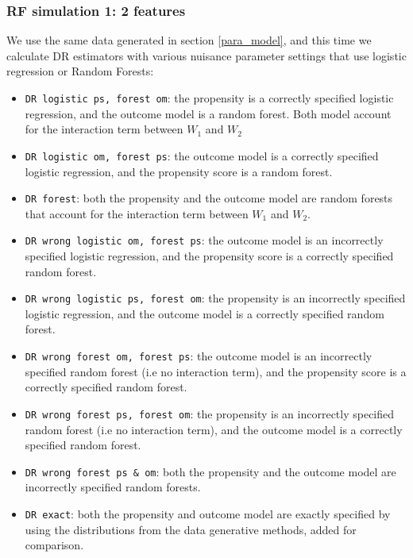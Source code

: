 \documentclass[12pt,twoside]{article}
\begin{document}

\subsubsection{RF simulation 1: 2 features}

We use the same data generated in section \ref{para_model}, and this time we calculate DR estimators with various nuisance parameter settings that use logistic regression or Random Forests:
\begin{itemize}
    \item \texttt{DR logistic ps, forest om}: the propensity is a correctly specified logistic regression, and the outcome model is a random forest. Both model account for the interaction term between $W_1$ and $W_2$
    \item \texttt{DR logistic om, forest ps}: the outcome model is a correctly specified logistic regression, and the propensity score is a random forest.
    \item \texttt{DR forest}: both the propensity and the outcome model are random forests that account for the interaction term between $W_1$ and $W_2$.
    \item \texttt{DR wrong logistic om, forest ps}: the outcome model is an incorrectly specified logistic regression, and the propensity score is a correctly specified random forest.
    \item \texttt{DR wrong logistic ps, forest om}: the propensity is an incorrectly specified logistic regression, and the outcome model is a correctly specified random forest.
    \item \texttt{DR wrong forest om, forest ps}: the outcome model is an incorrectly specified random forest (i.e no interaction term), and the propensity score is a correctly specified random forest.
    \item \texttt{DR wrong forest ps, forest om}: the propensity is an incorrectly specified random forest (i.e no interaction term), and the outcome model is a correctly specified random forest.
    \item \texttt{DR wrong forest ps \& om}: both the propensity and the outcome model are incorrectly specified random forests.
    \item \texttt{DR exact}: both the propensity and outcome model are exactly specified by using the distributions from the data generative methods, added for comparison.
\end{itemize}
\end{document}
